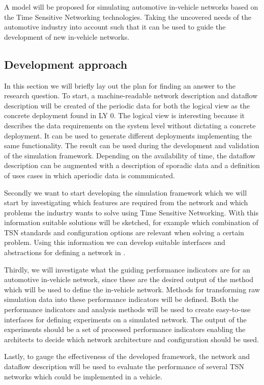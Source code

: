 A model will be proposed for simulating automotive in-vehicle networks based on the Time Sensitive Networking technologies. Taking the uncovered needs of the automotive industry into account such that it can be used to guide the development of new in-vehicle networks.

\subsection{Development approach}
\label{sec:researchdevelopment}
In this section we will briefly lay out the plan for finding an answer to the research question. To start, a machine-readable network description and dataflow description will be created of the periodic data for both the logical view as the concrete deployment found in LY 0. The logical view is interesting because it describes the data requirements on the system level without dictating a concrete deployment. It can be used to generate different deployments implementing the same functionality. The result can be used during the development and validation of the simulation framework. Depending on the availability of time, the dataflow description can be augmented with a description of sporadic data and a definition of uses cases in which aperiodic data is communicated.

Secondly we want to start developing the simulation framework which we will start by investigating which features are required from the network and which problems the industry wants to solve using Time Sensitive Networking. With this information suitable solutions will be sketched, for example which combination of TSN standards and configuration options are relevant when solving a certain problem. Using this information we can develop suitable interfaces and abstractions for defining a network in \omnet. 

Thirdly, we will investigate what the guiding performance indicators are for an automotive in-vehicle network, since these are the desired output of the method which will be used to define the in-vehicle network. Methods for transforming raw simulation data into these performance indicators will be defined. Both the performance indicators and analysis methods will be used to create easy-to-use interfaces for defining experiments on a simulated network. The output of the experiments should be a set of processed performance indicators enabling the architects to decide which network architecture and configuration should be used.

Lastly, to gauge the effectiveness of the developed framework, the network and dataflow description will be used to evaluate the performance of several TSN networks which could be implemented in a vehicle.

